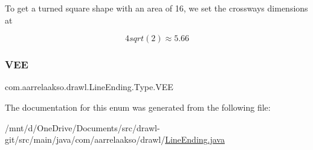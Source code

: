 To get a turned square shape with an area of 16, we set the crossways dimensions at

\[4 sqrt(2) \approx 5.66\] \mbox{\label{enumcom_1_1aarrelaakso_1_1drawl_1_1_line_ending_1_1_type_a19cae46d0b7da7cea3da79f650474a98}} 
\subsubsection{\texorpdfstring{V\+EE}{VEE}}
{\footnotesize\ttfamily com.\+aarrelaakso.\+drawl.\+Line\+Ending.\+Type.\+V\+EE}



The documentation for this enum was generated from the following file\+:\begin{DoxyCompactItemize}
\item 
/mnt/d/\+One\+Drive/\+Documents/src/drawl-\/git/src/main/java/com/aarrelaakso/drawl/\hyperlink{_line_ending_8java}{Line\+Ending.\+java}\end{DoxyCompactItemize}
